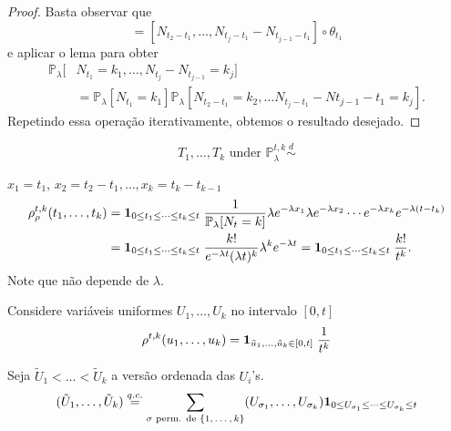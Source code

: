 \begin{topics}
\begin{proof}
  Basta observar que
  \begin{equation}
    [ N_{t_2} - N_{t_1}, \dots, N_{t_j} - N_{t_{j - 1}}] = [ N_{t_2 - t_1}, \dots, N_{t_j - t_1} - N_{t_{j - 1} - t_1}] \circ \theta_{t_1}
  \end{equation}
  e aplicar o lema para obter
  \begin{equation*}
    \begin{split}
      \mathbb{P}_\lambda \big[ & N_{t_1} = k_1, \dots, N_{t_j} - N_{t_{j - 1}} = k_j \big] \\
      & = \mathbb{P}_\lambda [ N_{t_1} = k_1] \mathbb{P}_\lambda [N_{t_2 - t_1} = k_2 , \dots N_{t_j - t_1} - N{t_{j - 1} - t_1} = k_j].
    \end{split}
  \end{equation*}
  Repetindo essa operação iterativamente, obtemos o resultado desejado.
\end{proof}



\begin{equation}
  T_1, \dots, T_k \text{ under } \mathbb{P}^{t, k}_\lambda \overset{d}\sim
\end{equation}


$x_1 = t_1$, $x_2 = t_2 - t_1, \dots, x_k = t_k - t_{k - 1}$
\begin{equation}
  \begin{split}
    \rho^{t, k}_\rho (t_1, \dots, t_k) & = {\bf 1}_{0 \leq t_1 \leq \dots \leq t_k \leq t} \; \frac{1}{\mathbb{P}_\lambda [N_t = k]}
    \lambda e^{-\lambda x_1} \lambda e^{-\lambda x_2} \cdots e^{ - \lambda x_k} e^{ - \lambda (t - t_k) }\\
    & = {\bf 1}_{0 \leq t_1 \leq \dots \leq t_k \leq t} \; \frac{k!}{e^{-\lambda t} (\lambda t)^k} \lambda^k e^{-\lambda t} = {\bf 1}_{0 \leq t_1 \leq \dots \leq t_k \leq t} \; \frac{k!}{t^k}.
\end{split}
\end{equation}
Note que não depende de $\lambda$.


Considere variáveis uniformes $U_1, \dots, U_k$ no intervalo $[0, t]$
\begin{equation}
  \rho^{t, k} (u_1, \dots, u_k) = {\bf 1}_{\tilde{u}_1, \dots, \tilde{u}_k \in [0, t]} \; \frac{1}{t^k}
\end{equation}

Seja $\tilde{U}_1 < \dots < \tilde{U}_k$ a versão ordenada das $U_i$'s.
\begin{equation}
  (\tilde{U}_1, \dots, \tilde{U}_k) \overset{q.c.}= \sum_{\sigma \text{ perm. de $\{1, \dots, k\}$}} (U_{\sigma_1}, \dots, U_{\sigma_k}) {\bf 1}_{0 \leq U_{\sigma_1} \leq \dots \leq U_{\sigma_k} \leq t}
\end{equation}


\end{topics}
